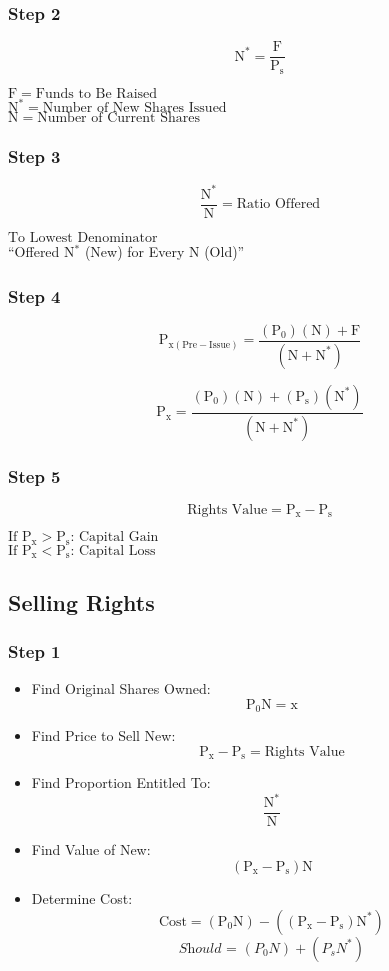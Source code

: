 \documentclass[11pt, english]{article}
\begin{document}
		\subsubsection{Step 2}

	$$\mathrm{N^*=\frac{F}{P_s}}$$

	$\mathrm{F=\textrm{Funds to Be Raised}}$\\
	$\mathrm{N^*=\textrm{Number of New Shares Issued}}$\\
	$\mathrm{N=\textrm{Number of Current Shares}}$
	
		\subsubsection{Step 3}

	$$\mathrm{\frac{N^*}{N}=\textrm{Ratio Offered}}$$

	$\mathrm{\textrm{To Lowest Denominator}}$\\
	``Offered N$^*$ (New) for Every N (Old)''

		\subsubsection{Step 4}

	$$\mathrm{P_{x(Pre-Issue)}=\frac{(P_0)(N)+F}{(N+N^*)}}$$

	$$\mathrm{P_x=\frac{(P_0)(N)+(P_s)(N^*)}{(N+N^*)}}$$

		\subsubsection{Step 5}

	$$\mathrm{\textrm{Rights Value}=P_x-P_s}$$

	$\mathrm{\textrm{If }P_x>P_s\textrm{: Capital Gain}}$\\
	$\mathrm{\textrm{If }P_x<P_s\textrm{: Capital Loss}}$

	\subsection{Selling Rights}

		\subsubsection{Step 1}

	\begin{itemize}
		\item Find Original Shares Owned: $$\mathrm{P_0N=x}$$
		\item Find Price to Sell New: $$\mathrm{P_x-P_s=\textrm{Rights Value}}$$
		\item Find Proportion Entitled To: $$\mathrm{\frac{N^*}{N}}$$
		\item Find Value of New: $$\mathrm{(P_x-P_s)N}$$
		\item Determine Cost: $$\mathrm{\textrm{Cost}=(P_0N)-((P_x-P_s)N^*)}$$ $$\mathit{\textrm{Should = }(P_0N)+(P_sN^*)}$$
	\end{itemize}
\end{document}
